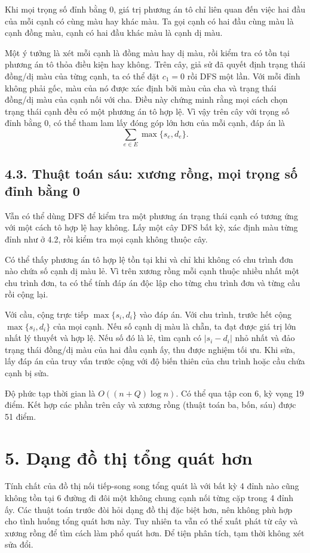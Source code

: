 \documentclass[11pt]{article}
\begin{document}
Khi mọi trọng số đỉnh bằng 0, giá trị phương án tô chỉ liên quan đến việc hai
đầu của mỗi cạnh có cùng màu hay khác màu. Ta gọi cạnh có hai đầu cùng màu là
cạnh đồng màu, cạnh có hai đầu khác màu là cạnh dị màu.

Một ý tưởng là xét mỗi cạnh là đồng màu hay dị màu, rồi kiểm tra có tồn tại
phương án tô thỏa điều kiện hay không. Trên cây, giả sử đã quyết định trạng
thái đồng/dị màu của từng cạnh, ta có thể đặt \(c_1=0\) rồi DFS một lần. Với
mỗi đỉnh không phải gốc, màu của nó được xác định bởi màu của cha và trạng
thái đồng/dị màu của cạnh nối với cha. Điều này chứng minh rằng mọi cách chọn
trạng thái cạnh đều có một phương án tô hợp lệ. Vì vậy trên cây với trọng số
đỉnh bằng 0, có thể tham lam lấy đóng góp lớn hơn của mỗi cạnh, đáp án là
\[
  \sum_{e\in E}\max\{s_e,d_e\}.
\]

\subsection*{4.3. Thuật toán sáu: xương rồng, mọi trọng số đỉnh bằng 0}

Vẫn có thể dùng DFS để kiểm tra một phương án trạng thái cạnh có tương ứng với
một cách tô hợp lệ hay không. Lấy một cây DFS bất kỳ, xác định màu từng đỉnh
như ở 4.2, rồi kiểm tra mọi cạnh không thuộc cây.

Có thể thấy phương án tô hợp lệ tồn tại khi và chỉ khi không có chu trình đơn
nào chứa số cạnh dị màu lẻ. Vì trên xương rồng mỗi cạnh thuộc nhiều nhất một
chu trình đơn, ta có thể tính đáp án độc lập cho từng chu trình đơn và từng
cầu rồi cộng lại.

Với cầu, cộng trực tiếp \(\max\{s_i,d_i\}\) vào đáp án. Với chu trình, trước
hết cộng \(\max\{s_i,d_i\}\) của mọi cạnh. Nếu số cạnh dị màu là chẵn, ta đạt
được giá trị lớn nhất lý thuyết và hợp lệ. Nếu số đó là lẻ, tìm cạnh có
\(|s_i-d_i|\) nhỏ nhất và đảo trạng thái đồng/dị màu của hai đầu cạnh ấy, thu
được nghiệm tối ưu. Khi sửa, lấy đáp án của truy vấn trước cộng với độ biến
thiên của chu trình hoặc cầu chứa cạnh bị sửa.

Độ phức tạp thời gian là \(O((n+Q)\log n)\). Có thể qua tập con 6, kỳ vọng 19
điểm. Kết hợp các phần trên cây và xương rồng (thuật toán ba, bốn, sáu) được
51 điểm.

\section*{5. Dạng đồ thị tổng quát hơn}

Tính chất của đồ thị nối tiếp-song song tổng quát là với bất kỳ 4 đỉnh nào
cũng không tồn tại 6 đường đi đôi một không chung cạnh nối từng cặp trong 4
đỉnh ấy. Các thuật toán trước đòi hỏi dạng đồ thị đặc biệt hơn, nên không phù
hợp cho tình huống tổng quát hơn này. Tuy nhiên ta vẫn có thể xuất phát từ
cây và xương rồng để tìm cách làm phổ quát hơn. Để tiện phân tích, tạm thời
không xét sửa đổi.
\end{document}
